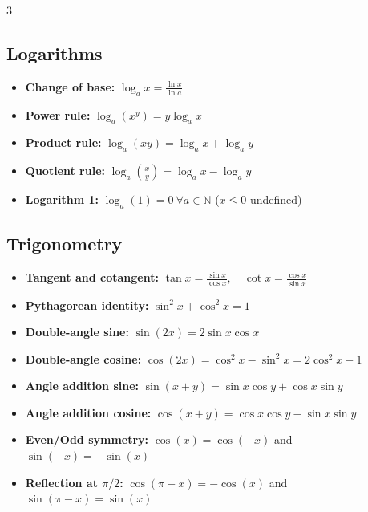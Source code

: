 \begin{multicols*}{3}
\subsection*{Logarithms}
\begin{itemize}[noitemsep, topsep=0pt, leftmargin=*]
\item \textbf{Change of base:} $\log_a x=\frac{\ln x}{\ln a}$
\item \textbf{Power rule:} $\log_a(x^y)=y\log_a x$
\item \textbf{Product rule:} $\log_a(xy)=\log_a x+\log_a y$
\item \textbf{Quotient rule:} $\log_a\left(\frac xy\right)=\log_a x-\log_a y$
\item \textbf{Logarithm 1:} $\log_a\left(1\right)=0 \ \forall a \in \mathbb{N}$ ($x \leq 0$ undefined)
\end{itemize}

\subsection*{Trigonometry}
\begin{itemize}[noitemsep, topsep=0pt, leftmargin=*]
\item \textbf{Tangent and cotangent:} $\tan x=\frac{\sin x}{\cos x},\quad \cot x=\frac{\cos x}{\sin x}$
\item \textbf{Pythagorean identity:} $\sin^2x+\cos^2x=1$
\item \textbf{Double-angle sine:} $\sin(2x)=2\sin x\cos x$
\item \textbf{Double-angle cosine:} $\cos(2x)=\cos^2x-\sin^2x=2\cos^2x-1$
\item \textbf{Angle addition sine:} $\sin(x+y)=\sin x\cos y+\cos x\sin y$
\item \textbf{Angle addition cosine:} $\cos(x+y)=\cos x\cos y-\sin x\sin y$
\item \textbf{Even/Odd symmetry:} $\cos(x)=\cos(-x)$ and $\sin(-x)=-\sin(x)$
\item \textbf{Reflection at $\pi/2$:} $\cos(\pi-x)=-\cos(x)$ and $\sin(\pi-x)=\sin(x)$
\end{itemize}


\end{multicols*}

